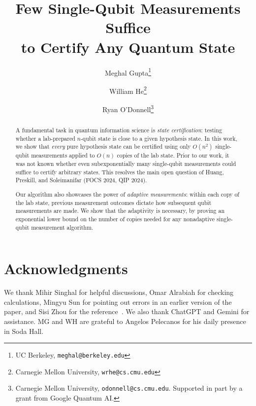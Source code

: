 \documentclass[11pt]{article}
\title{Few Single-Qubit Measurements Suffice\\to Certify Any Quantum State}
\author{Meghal Gupta\thanks{UC Berkeley, \texttt{meghal@berkeley.edu}}\and William He\thanks{Carnegie Mellon University, \texttt{wrhe@cs.cmu.edu}}\and Ryan O'Donnell\thanks{Carnegie Mellon University, \texttt{odonnell@cs.cmu.edu}. Supported in part by a grant from Google Quantum AI.}}
\begin{document}
\allowdisplaybreaks
\maketitle
\begin{abstract}
   
    A fundamental task in quantum information science is \emph{state certification}: testing whether a lab-prepared $n$-qubit state is close to a given hypothesis state. In this work, we show that \emph{every} pure hypothesis state can be certified using only $O(n^2)$ single-qubit measurements applied to $O(n)$ copies of the lab state. Prior to our work, it was not known whether even subexponentially many single-qubit measurements could suffice to certify arbitrary states.
    This resolves the main open question of Huang, Preskill, and Soleimanifar (FOCS 2024, QIP 2024).

    
    Our algorithm also showcases the power of \emph{adaptive measurements}: within each copy of the lab state,  previous measurement outcomes dictate how subsequent qubit measurements are made. We show that the adaptivity is necessary, by proving an exponential lower bound on the number of copies needed for any nonadaptive single-qubit measurement algorithm.  
\end{abstract}



\section*{Acknowledgments}
We thank Mihir Singhal for helpful discussions, Omar Alrabiah for checking calculations, Mingyu Sun for pointing out errors in an earlier version of the paper, and Sisi Zhou for the reference~\cite{zhou2020saturating}. We also thank ChatGPT and Gemini for assistance. MG and WH are grateful to Angelos Pelecanos for his daily presence in Soda Hall.




%
\end{document}
